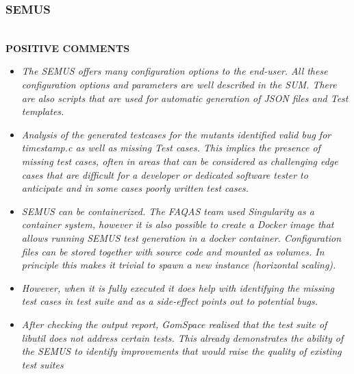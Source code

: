 \subsubsection{SEMUS} \ \\ 
 

 
\textbf{POSITIVE COMMENTS} 
 
\begin{itemize}
\item \emph{The SEMUS offers many configuration options to the end-user. All these configuration options and parameters are well described in the SUM. There are also scripts that are used for automatic generation of JSON files and Test templates.} 

 

\item \emph{Analysis of the generated testcases for the mutants identified valid bug for timestamp.c as well as missing Test cases. This implies the presence of missing test cases, often in areas that can be considered as challenging edge cases that are difficult for a developer or dedicated software tester to anticipate and in some cases poorly written test cases.} 

 

\item \emph{SEMUS can be containerized. The FAQAS team used Singularity as a container system, however it is also possible to create a Docker image that allows running SEMUS test generation in a docker container. Configuration files can be stored together with source code and mounted as volumes. In principle this makes it trivial to spawn a new instance (horizontal scaling).} 

 

\item \emph{However, when it is fully executed it does help with identifying the missing test cases in test suite and as a side-effect points out to potential bugs.} 

 

\item \emph{After checking the output report, GomSpace realised that the test suite of libutil does not address certain tests. This already demonstrates the ability of the SEMUS to identify improvements that would raise the quality of existing test suites }
\end{itemize}
 



